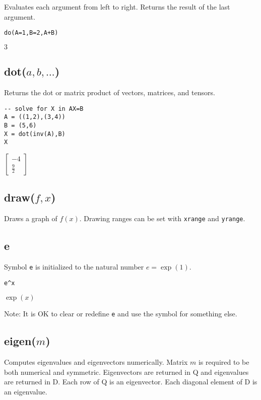 Evaluates each argument from left to right.
Returns the result of the last argument.

{\color{blue}
\begin{verbatim}
do(A=1,B=2,A+B)
\end{verbatim}
}

\noindent
$3$

\subsection*{dot($a,b,\ldots$)}

Returns the dot or matrix product of vectors, matrices, and tensors.

{\color{blue}
\begin{verbatim}
-- solve for X in AX=B
A = ((1,2),(3,4))
B = (5,6)
X = dot(inv(A),B)
X
\end{verbatim}
}

\noindent
$\displaystyle \begin{bmatrix}-4\\ \tfrac{9}{2}\end{bmatrix}$

\subsection*{draw($f,x$)}

Draws a graph of $f(x)$.
Drawing ranges can be set with {\tt xrange} and {\tt yrange}.

\subsection*{e}

Symbol {\tt e} is initialized to the natural number $e=\exp(1)$.

{\color{blue}
\begin{verbatim}
e^x
\end{verbatim}
}

\noindent
$\exp(x)$

\bigskip
\noindent
Note: It is OK to clear or redefine {\tt e} and use the symbol for something else.

\subsection*{eigen($m$)}

Computes eigenvalues and eigenvectors numerically.
Matrix $m$ is required to be both numerical and symmetric.
Eigenvectors are returned in Q and eigenvalues are returned in D.
Each row of Q is an eigenvector.
Each diagonal element of D is an eigenvalue.

